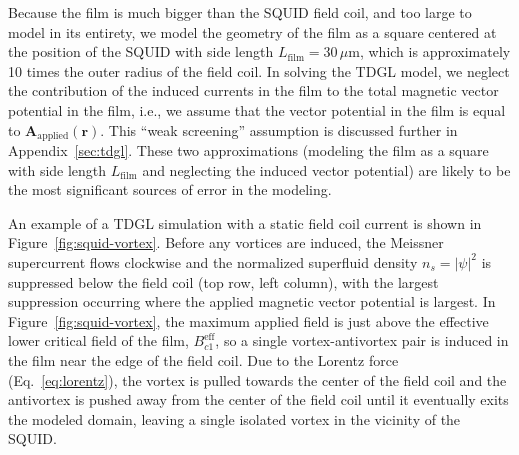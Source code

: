 \documentclass[%
 reprint,
 superscriptaddress,
 amsmath,
 amssymb,
 amsfonts,
 aps,
 prb,
]{revtex4-2}
\newcommand{\um}{\mu\mathrm{m}}
\begin{document}
Because the film is much bigger than the SQUID field coil, and too large to model in its entirety, we model the geometry of the film as a square centered at the position of the SQUID with side length $L_\mathrm{film}=30\,\um$, which is approximately 10 times the outer radius of the field coil. In solving the TDGL model, we neglect the contribution of the induced currents in the film to the total magnetic vector potential in the film, i.e., we assume that the vector potential in the film is equal to $\mathbf{A}_\mathrm{applied}(\mathbf{r})$. This ``weak screening'' assumption is discussed further in Appendix~\ref{sec:tdgl}. These two approximations (modeling the film as a square with side length $L_\mathrm{film}$ and neglecting the induced vector potential) are likely to be the most significant sources of error in the modeling.

An example of a TDGL simulation with a static field coil current is shown in Figure~\ref{fig:squid-vortex}. Before any vortices are induced, the Meissner supercurrent flows clockwise and the normalized superfluid density $n_s=|\psi|^2$ is suppressed below the field coil (top row, left column), with the largest suppression occurring where the applied magnetic vector potential is largest. In Figure~\ref{fig:squid-vortex}, the maximum applied field is just above the effective lower critical field of the film, $B_{c1}^\mathrm{eff}$, so a single vortex-antivortex pair is induced in the film near the edge of the field coil. Due to the Lorentz force (Eq.~\ref{eq:lorentz}), the vortex is pulled towards the center of the field coil and the antivortex is pushed away from the center of the field coil until it eventually exits the modeled domain, leaving a single isolated vortex in the vicinity of the SQUID.
\end{document}
